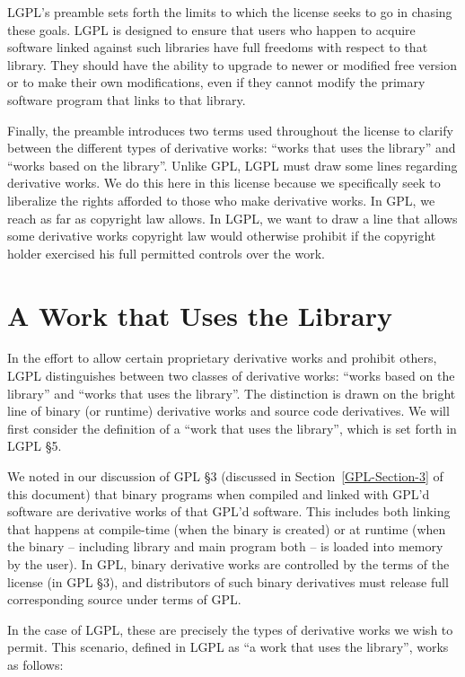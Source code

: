 \documentclass[12pt]{report}
\begin{document}
LGPL's preamble sets forth the limits to which the license seeks to go in
chasing these goals.  LGPL is designed to ensure that users who happen to
acquire software linked against such libraries have full freedoms with
respect to that library.  They should have the ability to upgrade to newer
or modified free version or to make their own modifications, even if they
cannot modify the primary software program that links to that library.

Finally, the preamble introduces two terms used throughout the license to
clarify between the different types of derivative works: ``works that uses
the library'' and ``works based on the library''.  Unlike GPL, LGPL must
draw some lines regarding derivative works.  We do this here in this
license because we specifically seek to liberalize the rights afforded to
those who make derivative works.  In GPL, we reach as far as copyright law
allows.  In LGPL, we want to draw a line that allows some derivative works
copyright law would otherwise prohibit if the copyright holder exercised
his full permitted controls over the work.

\section{A Work that Uses the Library}

In the effort to allow certain proprietary derivative works and prohibit
others, LGPL distinguishes between two classes of derivative works:
``works based on the library'' and ``works that uses the library''.  The
distinction is drawn on the bright line of binary (or runtime) derivative
works and source code derivatives.  We will first consider the definition
of a ``work that uses the library'', which is set forth in LGPL \S 5.

We noted in our discussion of GPL \S 3 (discussed in
Section~\ref{GPL-Section-3} of this document) that binary programs when
compiled and linked with GPL'd software are derivative works of that GPL'd
software.  This includes both linking that happens at compile-time (when
the binary is created) or at runtime (when the binary -- including library
and main program both -- is loaded into memory by the user).  In GPL,
binary derivative works are controlled by the terms of the license (in GPL
\S 3), and distributors of such binary derivatives must release full
corresponding source under terms of GPL\@.

In the case of LGPL, these are precisely the types of derivative works
we wish to permit.  This scenario, defined in LGPL as ``a work that uses
the library'', works as follows:
\end{document}
